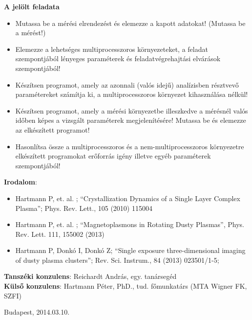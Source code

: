 \begin{flushleft}
\textbf{A jelölt feladata}

\begin{itemize}
	\item Mutassa be a mérési elrendezést és elemezze a kapott adatokat! (Mutassa
	be a mérést!)
	\item Elemezze a lehetséges multiprocesszoros környezeteket, a feladat
	szempontjából lényeges paraméterek és feladatvégrehajtási elvárások szempontjából!
	\item Készítsen programot, amely az azonnali (valós idejű) analízisben résztvevő paramétereket számítja ki, a
	multiprocesszoros környezet kihasználása nélkül!
	\item Készítsen programot, amely a mérési környezetbe illeszkedve a mérésnél
	valós időben képes a vizsgált paraméterek megjelenítésére! Mutassa be és
	elemezze az elkészített programot!
	\item Hasonlítsa össze a multiprocesszoros és a nem-multiprocesszoros
	környezetre elkészített programokat erőforrás igény illetve egyéb paraméterek szempontjából!
\end{itemize}
\end{flushleft}

\begin{flushleft}
\textbf{Irodalom}:
\begin{itemize}
	\item \cite{Hartmann2010} Hartmann P, et. al. ; “Crystallization Dynamics of a Single Layer Complex Plasma”;
	Phys. Rev. Lett., 105 (2010) 115004
	\item \cite{Hartmann2013} Hartmann P, et. al. ; “Magnetoplasmons in Rotating Dusty	Plasmas”, Phys.	Rev. Lett.
	111, 155002 (2013)
	\item \cite{HartmannP2013} Hartmann P, Donkó I, Donkó Z; “Single exposure three-dimensional imaging of dusty
	plasma clusters”; Rev. Sci. Instrum., 84 (2013) 023501/1-5;
\end{itemize}
\end{flushleft}

\begin{flushleft}
\vspace*{1cm}
\textbf{Tanszéki konzulens}: Reichardt András, egy. tanársegéd\\
\textbf{Külső konzulens}: Hartmann Péter, PhD., tud. főmunkatárs (MTA Wigner FK, SZFI)
\end{flushleft}



\begin{flushleft}
\vspace*{1cm}
Budapest, 2014.03.10.
\end{flushleft}
